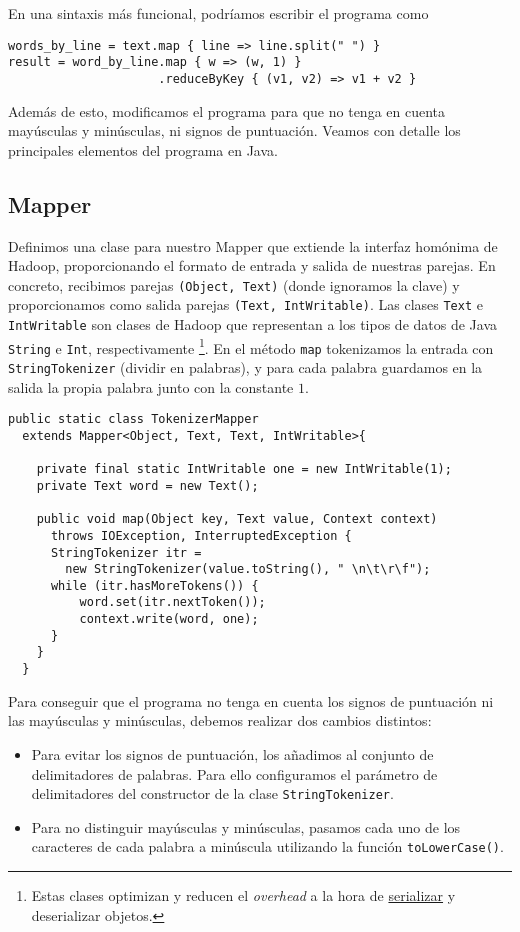 \documentclass[11pt]{article}
\begin{document}
En una sintaxis más funcional, podríamos escribir el programa como

\begin{verbatim}
words_by_line = text.map { line => line.split(" ") }
result = word_by_line.map { w => (w, 1) }
                     .reduceByKey { (v1, v2) => v1 + v2 }
\end{verbatim}

Además de esto, modificamos el programa para que no tenga en cuenta mayúsculas y minúsculas, ni signos de puntuación. Veamos con detalle los principales elementos del programa en Java.

\subsection*{Mapper}

Definimos una clase para nuestro Mapper que extiende la interfaz homónima de Hadoop, proporcionando el formato de entrada y salida de nuestras parejas. En concreto, recibimos parejas \verb|(Object, Text)| (donde ignoramos la clave) y proporcionamos como salida parejas \verb|(Text, IntWritable)|. Las clases \verb|Text| e \verb|IntWritable| son clases de Hadoop que representan a los tipos de datos de Java \verb|String| e \verb|Int|, respectivamente \footnote{Estas clases optimizan y reducen el \textit{overhead} a la hora de \href{https://en.wikipedia.org/wiki/Serialization}{serializar} y deserializar objetos.}. En el método \verb|map| tokenizamos la entrada con \verb|StringTokenizer| (dividir en palabras), y para cada palabra guardamos en la salida la propia palabra junto con la constante $1$.

\begin{verbatim}
public static class TokenizerMapper
  extends Mapper<Object, Text, Text, IntWritable>{

    private final static IntWritable one = new IntWritable(1);
    private Text word = new Text();

    public void map(Object key, Text value, Context context)
      throws IOException, InterruptedException {
      StringTokenizer itr =
        new StringTokenizer(value.toString(), " \n\t\r\f");
      while (itr.hasMoreTokens()) {
          word.set(itr.nextToken());
          context.write(word, one);
      }
    }
  }
\end{verbatim}

Para conseguir que el programa no tenga en cuenta los signos de puntuación ni las mayúsculas y minúsculas, debemos realizar dos cambios distintos:
\begin{itemize}
  \item Para evitar los signos de puntuación, los añadimos al conjunto de delimitadores de palabras. Para ello configuramos el parámetro de delimitadores del constructor de la clase \texttt{StringTokenizer}.
  \item Para no distinguir mayúsculas y minúsculas, pasamos cada uno de los caracteres de cada palabra a minúscula utilizando la función \texttt{toLowerCase()}.
\end{itemize}
\end{document}

